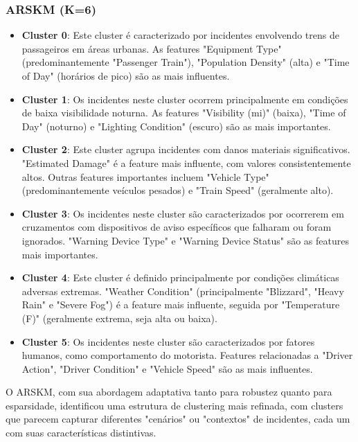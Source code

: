 \documentclass[conference]{IEEEtran}
\begin{document}
\subsubsection{ARSKM (K=6)}
\begin{itemize}
    \item \textbf{Cluster 0}: Este cluster é caracterizado por incidentes envolvendo trens de passageiros em áreas urbanas. As features "Equipment Type" (predominantemente "Passenger Train"), "Population Density" (alta) e "Time of Day" (horários de pico) são as mais influentes.
    
    \item \textbf{Cluster 1}: Os incidentes neste cluster ocorrem principalmente em condições de baixa visibilidade noturna. As features "Visibility (mi)" (baixa), "Time of Day" (noturno) e "Lighting Condition" (escuro) são as mais importantes.
    
    \item \textbf{Cluster 2}: Este cluster agrupa incidentes com danos materiais significativos. "Estimated Damage" é a feature mais influente, com valores consistentemente altos. Outras features importantes incluem "Vehicle Type" (predominantemente veículos pesados) e "Train Speed" (geralmente alto).
    
    \item \textbf{Cluster 3}: Os incidentes neste cluster são caracterizados por ocorrerem em cruzamentos com dispositivos de aviso específicos que falharam ou foram ignorados. "Warning Device Type" e "Warning Device Status" são as features mais importantes.
    
    \item \textbf{Cluster 4}: Este cluster é definido principalmente por condições climáticas adversas extremas. "Weather Condition" (principalmente "Blizzard", "Heavy Rain" e "Severe Fog") é a feature mais influente, seguida por "Temperature (F)" (geralmente extrema, seja alta ou baixa).
    
    \item \textbf{Cluster 5}: Os incidentes neste cluster são caracterizados por fatores humanos, como comportamento do motorista. Features relacionadas a "Driver Action", "Driver Condition" e "Vehicle Speed" são as mais influentes.
\end{itemize}

O ARSKM, com sua abordagem adaptativa tanto para robustez quanto para esparsidade, identificou uma estrutura de clustering mais refinada, com clusters que parecem capturar diferentes "cenários" ou "contextos" de incidentes, cada um com suas características distintivas.
\end{document}
